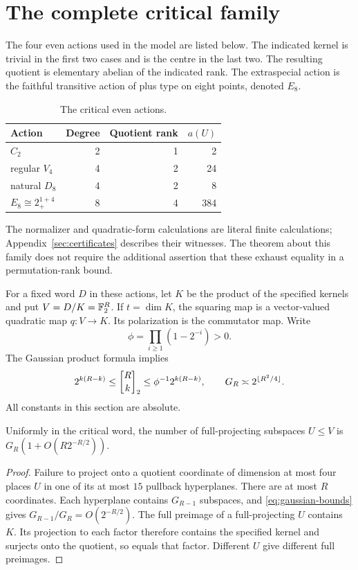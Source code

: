 \section{The complete critical family}\label{sec:critical}
The four even actions used in the model are listed below. The indicated
kernel is trivial in the first two cases and is the centre in the last
two. The resulting quotient is elementary abelian of the indicated rank.
The extraspecial action is the faithful transitive action of plus type
on eight points, denoted $E_8$.
\begin{table}[ht]
\centering
\begin{tabular}{lrrr}
\toprule
Action & Degree & Quotient rank & $a(U)$\\
\midrule
$C_2$ & 2 & 1 & 2\\
regular $V_4$ & 4 & 2 & 24\\
natural $D_8$ & 4 & 2 & 8\\
$E_8\cong 2_+^{1+4}$ & 8 & 4 & 384\\
\bottomrule
\end{tabular}
\caption{The critical even actions.}\label{tab:critical}
\end{table}
The normalizer and quadratic-form calculations are literal finite
calculations; Appendix~\ref{sec:certificates} describes their witnesses.
The theorem about this family does not require the additional assertion
that these exhaust equality in a permutation-rank bound.

For a fixed word $D$ in these actions, let $K$ be the product of the
specified kernels and put $V=D/K=\mathbb F_2^R$. If $t=\dim K$, the squaring
map is a vector-valued quadratic map $q:V\longrightarrow K$.
Its polarization is the commutator map. Write
\[
 \phi=\prod_{i\geq1}(1-2^{-i})>0.
\]
The Gaussian product formula implies
\begin{equation}\label{eq:gaussian-bounds}
 2^{k(R-k)}\leq\gauss Rk2\leq\phi^{-1}2^{k(R-k)},
 \qquad G_R\asymp2^{\lfloor R^2/4\rfloor}.
\end{equation}
All constants in this section are absolute.

\begin{lemma}\label{lem:canonical}
Uniformly in the critical word, the number of full-projecting subspaces
$U\leq V$ is $G_R(1+O(R2^{-R/2}))$.
\end{lemma}
\begin{proof}
Failure to project onto a quotient coordinate of dimension at most four
places $U$ in one of its at most $15$ pullback hyperplanes. There are at
most $R$ coordinates. Each hyperplane contains $G_{R-1}$ subspaces, and
\eqref{eq:gaussian-bounds} gives $G_{R-1}/G_R=O(2^{-R/2})$.
The full preimage of a full-projecting $U$ contains $K$. Its projection
to each factor therefore contains the specified kernel and surjects
onto the quotient, so equals that factor. Different $U$ give different
full preimages.
\end{proof}

